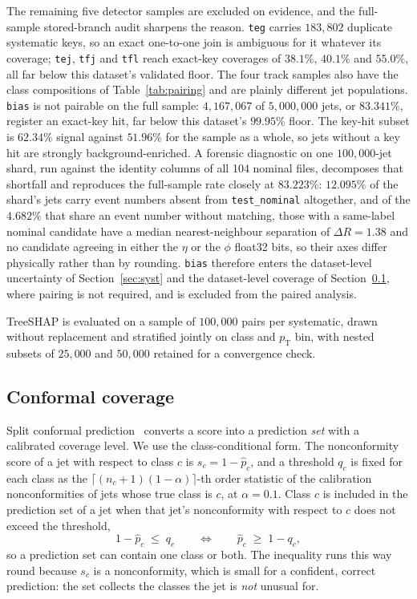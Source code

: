 \documentclass[pdflatex,sn-mathphys,Numbered,iicol]{sn-jnl}
\newcommand{\pt}{p_{\mathrm{T}}}
\newcommand{\dR}{\Delta R}
\begin{document}
The remaining five detector samples are excluded on evidence, and the full-sample
stored-branch audit sharpens the reason. \texttt{teg} carries $183{,}802$ duplicate
systematic keys, so an exact one-to-one join is ambiguous for it whatever its coverage;
\texttt{tej}, \texttt{tfj} and \texttt{tfl} reach exact-key coverages of $38.1\%$,
$40.1\%$ and $55.0\%$, all far below this dataset's validated floor. The four track samples
also have the class compositions of Table~\ref{tab:pairing} and are plainly different jet
populations. \texttt{bias} is not pairable on the full sample: $4{,}167{,}067$ of
$5{,}000{,}000$ jets, or $83.341\%$, register an exact-key hit, far below this
dataset's $99.95\%$ floor. The key-hit subset is $62.34\%$ signal against
$51.96\%$ for the sample as a whole, so jets without a key hit are strongly
background-enriched. A forensic diagnostic on one $100{,}000$-jet shard, run against
the identity columns of all 104 nominal files, decomposes that shortfall and reproduces
the full-sample rate closely at $83.223\%$: $12.095\%$ of the shard's jets carry event
numbers absent from \texttt{test\_nominal} altogether, and of the $4.682\%$ that share
an event number without matching, those with a same-label nominal candidate have a
median nearest-neighbour separation of $\dR = 1.38$ and no candidate agreeing in either
the $\eta$ or the $\phi$ float32 bits, so their axes differ physically rather than by
rounding. \texttt{bias} therefore enters the dataset-level uncertainty of
Section~\ref{sec:syst} and the dataset-level coverage of
Section~\ref{sec:conformalmethod}, where pairing is not required, and is excluded from
the paired analysis.

TreeSHAP is evaluated on a sample of $100{,}000$ pairs per systematic, drawn without
replacement and stratified jointly on class and $\pt$ bin, with nested subsets of
$25{,}000$ and $50{,}000$ retained for a convergence check.

\subsection{Conformal coverage}
\label{sec:conformalmethod}

Split conformal prediction~\cite{Vovk2005,Angelopoulos2023} converts a score into a
prediction \emph{set} with a calibrated coverage level. We use the class-conditional
form. The nonconformity score of a jet with respect to class $c$ is $s_c = 1 - \hat
p_c$, and a threshold $q_c$ is fixed for each class as the
$\lceil (n_c+1)(1-\alpha) \rceil$-th order statistic of the calibration nonconformities
of jets whose true class is $c$, at $\alpha = 0.1$. Class $c$ is included in the
prediction set of a jet when that jet's nonconformity with respect to $c$ does not
exceed the threshold,
\begin{equation}
1 - \hat p_c \;\le\; q_c
\qquad\Longleftrightarrow\qquad
\hat p_c \;\ge\; 1 - q_c ,
\label{eq:conformalrule}
\end{equation}
so a prediction set can contain one class or both. The inequality runs this way round
because $s_c$ is a nonconformity, which is small for a confident, correct prediction:
the set collects the classes the jet is \emph{not} unusual for.
\end{document}
